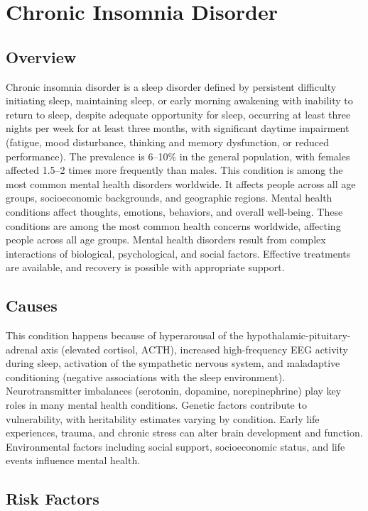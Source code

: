 \chapter{Chronic Insomnia Disorder}
\label{sec:Chronic Insomnia Disorder}

\section{Overview}
Chronic insomnia disorder is a sleep disorder defined by persistent difficulty initiating sleep, maintaining sleep, or early morning awakening with inability to return to sleep, despite adequate opportunity for sleep, occurring at least three nights per week for at least three months, with significant daytime impairment (fatigue, mood disturbance, thinking and memory dysfunction, or reduced performance). The prevalence is 6--10\% in the general population, with females affected 1.5--2 times more frequently than males. This condition is among the most common mental health disorders worldwide. It affects people across all age groups, socioeconomic backgrounds, and geographic regions. Mental health conditions affect thoughts, emotions, behaviors, and overall well-being. These conditions are among the most common health concerns worldwide, affecting people across all age groups. Mental health disorders result from complex interactions of biological, psychological, and social factors. Effective treatments are available, and recovery is possible with appropriate support.
\section{Causes}
This condition happens because of hyperarousal of the hypothalamic-pituitary-adrenal axis (elevated cortisol, ACTH), increased high-frequency EEG activity during sleep, activation of the sympathetic nervous system, and maladaptive conditioning (negative associations with the sleep environment).  Neurotransmitter imbalances (serotonin, dopamine, norepinephrine) play key roles in many mental health conditions. Genetic factors contribute to vulnerability, with heritability estimates varying by condition. Early life experiences, trauma, and chronic stress can alter brain development and function. Environmental factors including social support, socioeconomic status, and life events influence mental health.   
\section{Risk Factors}

